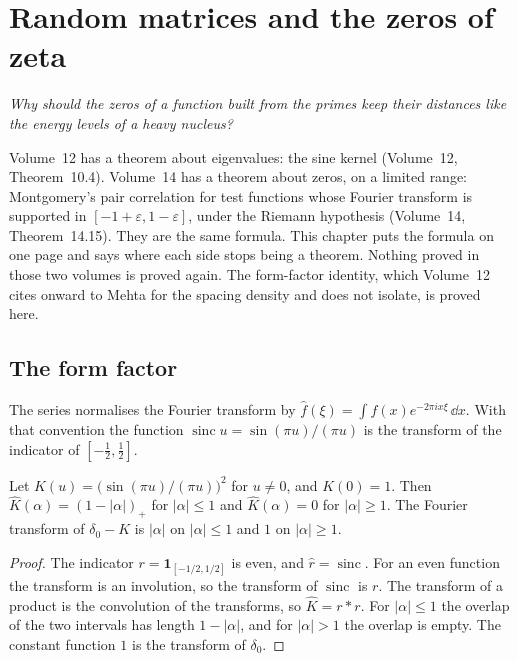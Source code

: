 \chapter{Random matrices and the zeros of zeta}\label{ch:oc-gue}

\begin{center}\itshape
Why should the zeros of a function built from the primes keep their distances like the energy levels of a heavy nucleus?
\end{center}

Volume~12 has a theorem about eigenvalues: the sine kernel (Volume~12, Theorem~10.4). Volume~14 has a theorem about zeros, on a limited range: Montgomery's pair correlation for test functions whose Fourier transform is supported in $[-1+\varepsilon,1-\varepsilon]$, under the Riemann hypothesis (Volume~14, Theorem~14.15). They are the same formula. This chapter puts the formula on one page and says where each side stops being a theorem. Nothing proved in those two volumes is proved again. The form-factor identity, which Volume~12 cites onward to Mehta for the spacing density and does not isolate, is proved here.

\section{The form factor}

The series normalises the Fourier transform by $\hat f(\xi)=\int f(x)e^{-2\pi ix\xi}\,\dd x$. With that convention the function $\operatorname{sinc}u=\sin(\pi u)/(\pi u)$ is the transform of the indicator of $[-\tfrac12,\tfrac12]$.

\begin{theorem}\label{thm:formfactor}
Let $K(u)=\bigl(\sin(\pi u)/(\pi u)\bigr)^2$ for $u\ne0$, and $K(0)=1$. Then $\hat K(\alpha)=(1-|\alpha|)_+$ for $|\alpha|\le1$ and $\hat K(\alpha)=0$ for $|\alpha|\ge1$. The Fourier transform of $\delta_0-K$ is $|\alpha|$ on $|\alpha|\le1$ and $1$ on $|\alpha|\ge1$.
\end{theorem}
\begin{proof}
The indicator $r=\mathbf 1_{[-1/2,1/2]}$ is even, and $\hat r=\operatorname{sinc}$. For an even function the transform is an involution, so the transform of $\operatorname{sinc}$ is $r$. The transform of a product is the convolution of the transforms, so $\hat K=r*r$. For $|\alpha|\le1$ the overlap of the two intervals has length $1-|\alpha|$, and for $|\alpha|>1$ the overlap is empty. The constant function $1$ is the transform of $\delta_0$.
\end{proof}

